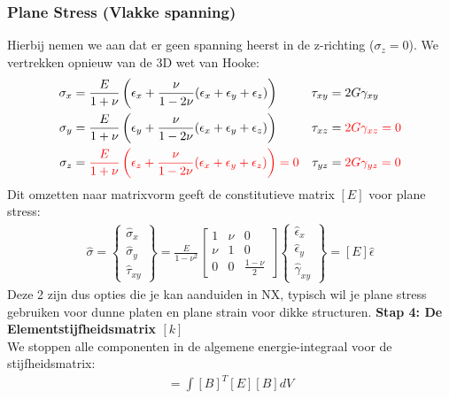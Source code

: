 \documentclass[a4paper,11pt,twoside]{report}
\begin{document}
\subsubsection{Plane Stress (Vlakke spanning)}
Hierbij nemen we aan dat er geen spanning heerst in de z-richting ($\sigma_z = 0$). We vertrekken
opnieuw van de 3D wet van Hooke:
\begin{align*}
    \sigma_x & = \frac{E}{1+\nu} \left( \epsilon_x + \frac{\nu}{1-2\nu}(\epsilon_x + \epsilon_y + \epsilon_z) \right)                  & \tau_{xy} & = 2G\gamma_{xy}                  \\
    \sigma_y & = \frac{E}{1+\nu} \left( \epsilon_y + \frac{\nu}{1-2\nu}(\epsilon_x + \epsilon_y + \epsilon_z) \right)                  & \tau_{xz} & = {\color{red}2G\gamma_{xz} = 0} \\
    \sigma_z & = {\color{red}\frac{E}{1+\nu} \left( \epsilon_z + \frac{\nu}{1-2\nu}(\epsilon_x + \epsilon_y + \epsilon_z) \right) = 0} & \tau_{yz} & = {\color{red}2G\gamma_{yz} = 0}
\end{align*}
Dit omzetten naar matrixvorm geeft de constitutieve matrix $[E]$ voor plane stress:
\begin{align*}
    \hat{\sigma} = \begin{Bmatrix} \hat{\sigma}_x \\ \hat{\sigma}_y \\ \hat{\tau}_{xy} \end{Bmatrix}
    = \frac{E}{1-\nu^2} \begin{bmatrix} 1 & \nu & 0 \\ \nu & 1 & 0 \\ 0 & 0 & \frac{1-\nu}{2} \end{bmatrix} \begin{Bmatrix} \hat{\epsilon}_x \\ \hat{\epsilon}_y \\ \hat{\gamma}_{xy} \end{Bmatrix} = [E]\hat{\epsilon}
\end{align*}
Deze 2 zijn dus opties die je kan aanduiden in NX, typisch wil je plane stress gebruiken voor dunne
platen en plane strain voor dikke structuren.
\newline
\textbf{Stap 4: De Elementstijfheidsmatrix $[k]$} \\
We stoppen alle componenten in de algemene energie-integraal voor de stijfheidsmatrix:
\begin{align*}
    [k] = \int [B]^T [E] [B] dV
\end{align*}
\end{document}
